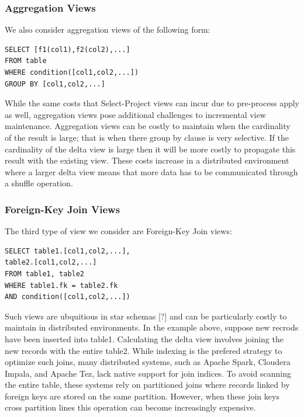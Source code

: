 



\subsubsection{Aggregation Views}

We also consider aggregation views of the following form:

\begin{lstlisting}
SELECT [f1(col1),f2(col2),...] 
FROM table 
WHERE condition([col1,col2,...]) 
GROUP BY [col1,col2,...]
\end{lstlisting}


While the same costs that Select-Project views can incur due to pre-process
apply as well, aggregation views pose additional challenges to incremental
view maintenance. Aggregation views can be costly to maintain when
the cardinality of the result is large; that is when there group by
clause is very selective. If the cardinality of the delta view is
large then it will be more costly to propagate this result with the existing
view. These costs increase in a distributed environment where a larger
delta view means that more data has to be communicated through a shuffle
operation. 


\subsubsection{Foreign-Key Join Views}

The third type of view we consider are Foreign-Key Join views:

\begin{lstlisting}
SELECT table1.[col1,col2,...], 
table2.[col1,col2,...]
FROM table1, table2 
WHERE table1.fk = table2.fk 
AND condition([col1,col2,...]) 
\end{lstlisting}


Such views are ubquitious in star schemas {[}?{]} and can be particularly
costly to maintain in distributed environments. In the example above,
suppose new recrods have been inserted into table1. Calculating the
delta view involves joining the new records with the entire table2.
While indexing is the prefered strategy to optimize such joins, many
distributed systems, such as Apache Spark, Cloudera Impala, and Apache
Tez, lack native support for join indices. To avoid scanning the entire
table, these systems rely on partitioned joins where records linked
by foreign keys are stored on the same partition. However, when these
join keys cross partition lines this operation can become increasingly
expensive.


